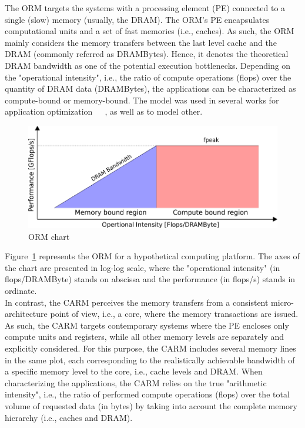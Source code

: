 \documentclass[twoside,twocolumn,8pt]{extarticle}
\begin{document}
The ORM targets the systems with a processing element (PE) connected to a single (slow) memory (usually, the DRAM). The ORM's
PE encapsulates computational units and a set of fast memories (i.e., caches). As such, the ORM mainly considers the memory
transfers between the last level cache and the DRAM (commonly referred as DRAMBytes). Hence, it denotes the theoretical DRAM
bandwidth as one of the potential execution bottlenecks. Depending on the "operational intensity", i.e., the ratio of compute
operations (flops) over the quantity of DRAM data (DRAMBytes), the applications can be characterized as compute-bound or
memory-bound. The model was used in several works for application
optimization~\cite{Kim20111201}~\cite{Rossinelli2164}~\cite{vanNieuwpoort:2009:UMH:1542275.1542337}, as well as to model other.

\begin{figure}
  \centering
  \includegraphics[width=.48\textwidth]{pictures/roofline_chart.png}
  \caption{ORM chart}
  \label{fig:roofline_chart}
\end{figure}

Figure~\ref{fig:roofline_chart} represents the ORM for a hypothetical computing platform. The axes of the chart are presented in
log-log scale, where the "operational intensity" (in flops/DRAMByte) stands on abscissa and the performance (in flops/s) stands
in ordinate.\\

In contrast, the CARM perceives the memory transfers from a consistent micro-architecture point of view, i.e., a core, where
the memory transactions are issued. As such, the CARM targets contemporary systems where the PE encloses only compute units
and registers, while all other memory levels are separately and explicitly considered. For this purpose, the CARM includes several
memory lines in the same plot, each corresponding to the realistically achievable bandwidth of a specific memory level to the core,
i.e., cache levels and DRAM. When characterizing the applications, the CARM relies on the true "arithmetic intensity", i.e., the
ratio of performed compute operations (flops) over the total volume of requested data (in bytes) by taking into account the
complete memory hierarchy (i.e., caches and DRAM).\\
\end{document}
